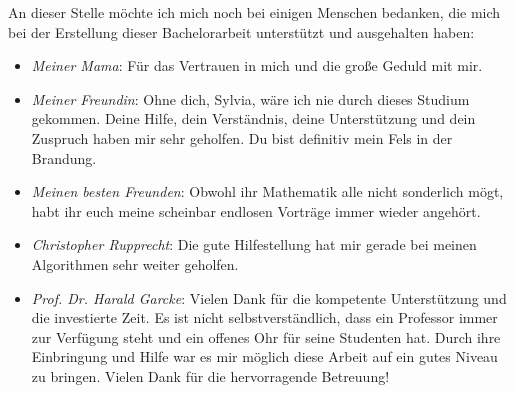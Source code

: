 \begin{large}
An dieser Stelle möchte ich mich noch bei einigen Menschen bedanken, die mich bei der Erstellung dieser Bachelorarbeit unterstützt und ausgehalten haben:
\begin{itemize}
\item \textit{Meiner Mama}: Für das Vertrauen in mich und die große Geduld mit mir.
\item \textit{Meiner Freundin}: Ohne dich, Sylvia, wäre ich nie durch dieses Studium gekommen. Deine Hilfe, dein Verständnis, deine Unterstützung und dein Zuspruch haben mir sehr geholfen. Du bist definitiv mein Fels in der Brandung.
\item \textit{Meinen besten Freunden}: Obwohl ihr Mathematik alle nicht sonderlich mögt, habt ihr euch meine scheinbar endlosen Vorträge immer wieder angehört.
\item \textit{Christopher Rupprecht}: Die gute Hilfestellung hat mir gerade bei meinen Algorithmen sehr weiter geholfen.
\item \textit{Prof. Dr. Harald Garcke}:  Vielen Dank für die kompetente Unterstützung und die investierte Zeit. Es ist nicht selbstverständlich, dass ein Professor immer zur Verfügung steht und ein offenes Ohr für seine Studenten hat. Durch ihre Einbringung und Hilfe war es mir möglich diese Arbeit auf ein gutes Niveau zu bringen. Vielen Dank für die hervorragende Betreuung!
\end{itemize}
\end{large}

